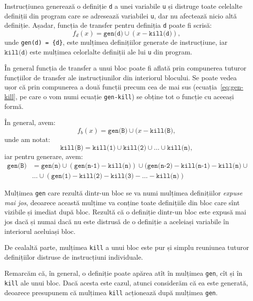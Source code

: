 Instrucțiunea generează o definiție \texttt{d} a unei variabile \texttt{u}
și distruge toate celelalte definiții din program care se adresează
variabilei \texttt{u}, dar nu afectează nicio altă definiție. Așadar,
funcția de transfer pentru definiția \texttt{d} poate fi scrisă:
\begin{equation}
    \label{eq:gen-kill}
    f_d(x) = \texttt{gen(d)} \cup (x - \texttt{kill(d)}),
\end{equation}
unde \texttt{gen(d) = \{d\}}, este mulțimea definițiilor
generate de instrucțiune, iar $ \texttt{kill(d)} $ este mulțimea
celorlalte definiții ale lui \texttt{u} din program.

În general funcția de transfer a unui bloc poate fi aflată prin
compunerea tuturor funcțiilor de transfer ale instrucțiunilor din interiorul
blocului. Se poate vedea ușor că prin compunerea a două funcții precum
cea de mai sus (ecuația~\eqref{eq:gen-kill}, pe care o vom numi ecuație
\texttt{gen-kill}) se obține tot o funcție cu aceeași formă.

În general, avem:
\begin{equation}
    \label{eq:fb}
    f_b(x) = \texttt{gen(B)} \cup (x - \texttt{kill(B)},
\end{equation}
unde am notat:
\[
    \texttt{kill(B)} = \texttt{kill(1)} \cup \texttt{kill(2)} \cup \dots \cup \texttt{kill(n)},
\]
iar pentru generare, avem:
\begin{align*}
    \texttt{gen(B)} &= \texttt{gen(n)} \cup (\texttt{gen(n-1)} - \texttt{kill(n)}) \cup %
    (\texttt{gen(n-2)} - \texttt{kill(n-1)} - \texttt{kill(n)} \cup \\
                    & \dots \cup (\texttt{gen(1)} - \texttt{kill(2)} - \texttt{kill(3)} - %
                    \dots - \texttt{kill(n)})
\end{align*}

Mulțimea \texttt{gen} care rezultă dintr-un bloc se va numi mulțimea definițiilor
\emph{expuse mai jos}, deoarece această mulțime va conține toate definițiile
din bloc care sînt vizibile și imediat după bloc. Rezultă că o definiție dintr-un
bloc este expusă mai jos dacă și numai dacă nu este distrusă de o definiție a
aceleiași variabile în interiorul aceluiași bloc.

De cealaltă parte, mulțimea \texttt{kill} a unui bloc este pur și simplu reuniunea
tuturor definițiilor distruse de instrucțiuni individuale.

Remarcăm că, în general, o definiție poate apărea atît în mulțimea \texttt{gen},
cît și în \texttt{kill} ale unui bloc. Dacă acesta este cazul, atunci
considerăm că ea este generată, deoarece presupunem că mulțimea \texttt{kill}
acționează după mulțimea \texttt{gen}.

